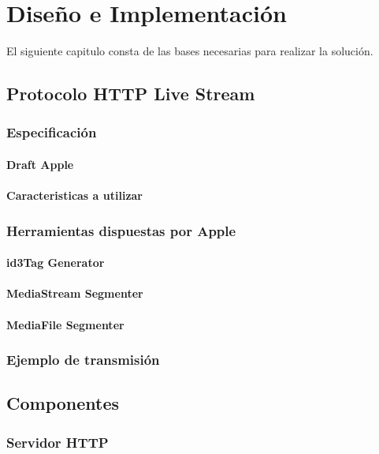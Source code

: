 \chapter{Diseño e Implementación}
El siguiente capitulo consta de las bases necesarias para realizar la solución.
\section{Protocolo HTTP Live Stream}
	\subsection{Especificación}
		\subsubsection{Draft Apple}
		\subsubsection{Caracteristicas a utilizar}
			
	\subsection{Herramientas dispuestas por Apple}
		\subsubsection{id3Tag Generator}
		\subsubsection{MediaStream Segmenter}
		\subsubsection{MediaFile Segmenter}
	\subsection{Ejemplo de transmisión}
\clearpage	
\section{Componentes}
	\subsection{Servidor HTTP}
